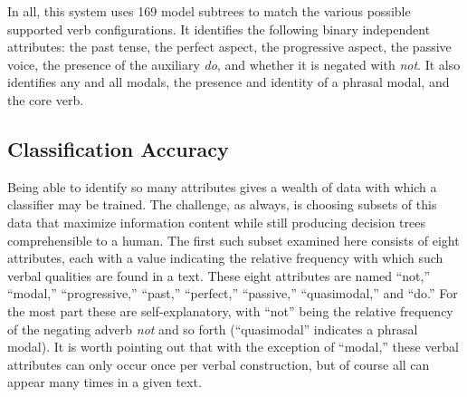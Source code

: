 \documentclass[main.tex]{subfiles}
\begin{document}
In all, this system uses 169 model subtrees to match the various possible supported verb configurations. It identifies the following binary independent attributes: the past tense, the perfect aspect, the progressive aspect, the passive voice, the presence of the auxiliary \textit{do}, and whether it is negated with \textit{not}. It also identifies any and all modals, the presence and identity of a phrasal modal, and the core verb.

\subsection{Classification Accuracy}
Being able to identify so many attributes gives a wealth of data with which a classifier may be trained. The challenge, as always, is choosing subsets of this data that maximize information content while still producing decision trees comprehensible to a human. The first such subset examined here consists of eight attributes, each with a value indicating the relative frequency with which such verbal qualities are found in a text. These eight attributes are named ``not,'' ``modal,'' ``progressive,'' ``past,'' ``perfect,'' ``passive,'' ``quasimodal,'' and ``do.'' For the most part these are self-explanatory, with ``not'' being the relative frequency of the negating adverb \textit{not} and so forth (``quasimodal'' indicates a phrasal modal). It is worth pointing out that with the exception of ``modal,'' these verbal attributes can only occur once per verbal construction, but of course all can appear many times in a given text. 
\end{document}

